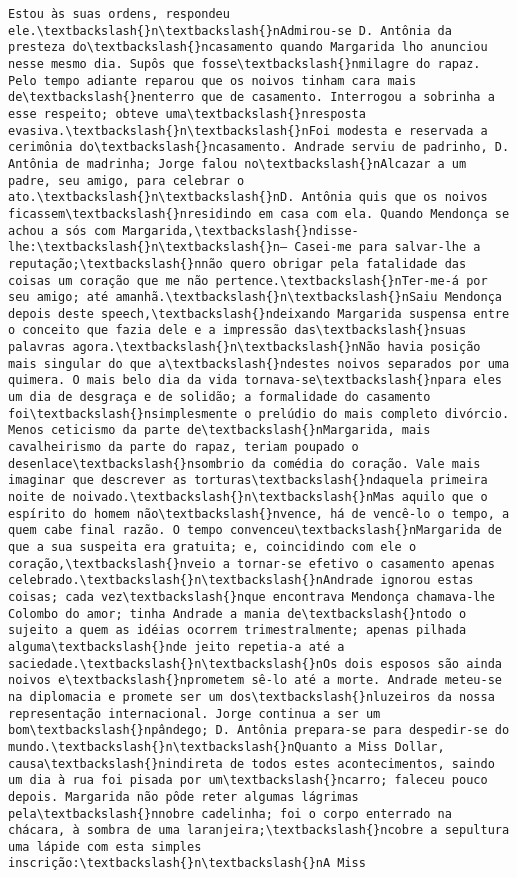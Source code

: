 \begin{Verbatim}[commandchars=\\\{\}]
Estou às suas ordens, respondeu ele.\textbackslash{}n\textbackslash{}nAdmirou-se D. Antônia da presteza do\textbackslash{}ncasamento quando Margarida lho anunciou nesse mesmo dia. Supôs que fosse\textbackslash{}nmilagre do rapaz. Pelo tempo adiante reparou que os noivos tinham cara mais de\textbackslash{}nenterro que de casamento. Interrogou a sobrinha a esse respeito; obteve uma\textbackslash{}nresposta evasiva.\textbackslash{}n\textbackslash{}nFoi modesta e reservada a cerimônia do\textbackslash{}ncasamento. Andrade serviu de padrinho, D. Antônia de madrinha; Jorge falou no\textbackslash{}nAlcazar a um padre, seu amigo, para celebrar o ato.\textbackslash{}n\textbackslash{}nD. Antônia quis que os noivos ficassem\textbackslash{}nresidindo em casa com ela. Quando Mendonça se achou a sós com Margarida,\textbackslash{}ndisse-lhe:\textbackslash{}n\textbackslash{}n— Casei-me para salvar-lhe a reputação;\textbackslash{}nnão quero obrigar pela fatalidade das coisas um coração que me não pertence.\textbackslash{}nTer-me-á por seu amigo; até amanhã.\textbackslash{}n\textbackslash{}nSaiu Mendonça depois deste speech,\textbackslash{}ndeixando Margarida suspensa entre o conceito que fazia dele e a impressão das\textbackslash{}nsuas palavras agora.\textbackslash{}n\textbackslash{}nNão havia posição mais singular do que a\textbackslash{}ndestes noivos separados por uma quimera. O mais belo dia da vida tornava-se\textbackslash{}npara eles um dia de desgraça e de solidão; a formalidade do casamento foi\textbackslash{}nsimplesmente o prelúdio do mais completo divórcio. Menos ceticismo da parte de\textbackslash{}nMargarida, mais cavalheirismo da parte do rapaz, teriam poupado o desenlace\textbackslash{}nsombrio da comédia do coração. Vale mais imaginar que descrever as torturas\textbackslash{}ndaquela primeira noite de noivado.\textbackslash{}n\textbackslash{}nMas aquilo que o espírito do homem não\textbackslash{}nvence, há de vencê-lo o tempo, a quem cabe final razão. O tempo convenceu\textbackslash{}nMargarida de que a sua suspeita era gratuita; e, coincidindo com ele o coração,\textbackslash{}nveio a tornar-se efetivo o casamento apenas celebrado.\textbackslash{}n\textbackslash{}nAndrade ignorou estas coisas; cada vez\textbackslash{}nque encontrava Mendonça chamava-lhe Colombo do amor; tinha Andrade a mania de\textbackslash{}ntodo o sujeito a quem as idéias ocorrem trimestralmente; apenas pilhada alguma\textbackslash{}nde jeito repetia-a até a saciedade.\textbackslash{}n\textbackslash{}nOs dois esposos são ainda noivos e\textbackslash{}nprometem sê-lo até a morte. Andrade meteu-se na diplomacia e promete ser um dos\textbackslash{}nluzeiros da nossa representação internacional. Jorge continua a ser um bom\textbackslash{}npândego; D. Antônia prepara-se para despedir-se do mundo.\textbackslash{}n\textbackslash{}nQuanto a Miss Dollar, causa\textbackslash{}nindireta de todos estes acontecimentos, saindo um dia à rua foi pisada por um\textbackslash{}ncarro; faleceu pouco depois. Margarida não pôde reter algumas lágrimas pela\textbackslash{}nnobre cadelinha; foi o corpo enterrado na chácara, à sombra de uma laranjeira;\textbackslash{}ncobre a sepultura uma lápide com esta simples inscrição:\textbackslash{}n\textbackslash{}nA Miss 
\end{Verbatim}
